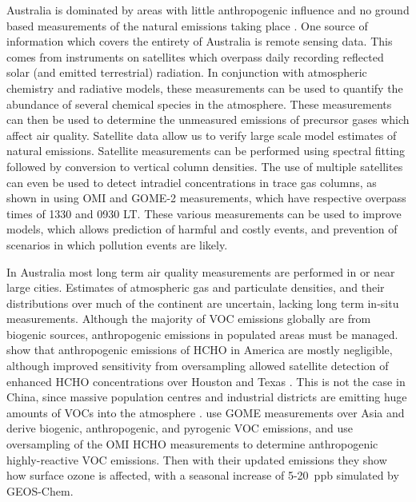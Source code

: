       Australia is dominated by areas with little anthropogenic influence and no ground based measurements of the natural emissions taking place \citep{VanDerA2008}.
      One source of information which covers the entirety of Australia is remote sensing data.
      This comes from instruments on satellites which overpass daily recording reflected solar (and emitted terrestrial) radiation.
      In conjunction with atmospheric chemistry and radiative models, these measurements can be used to quantify the abundance of several chemical species in the atmosphere.
      These measurements can then be used to determine the unmeasured emissions of precursor gases which affect air quality.
      Satellite data allow us to verify large scale model estimates of natural emissions.
      Satellite measurements can be performed using spectral fitting followed by conversion to vertical column densities.
      The use of multiple satellites can even be used to detect intradiel concentrations in trace gas columns, as shown in \cite{Stavrakou2015} using OMI and GOME-2 measurements, which have respective overpass times of 1330 and 0930 LT.
      These various measurements can be used to improve models, which allows prediction of harmful and costly events, and prevention of scenarios in which pollution events are likely.
      
      In Australia most long term air quality measurements are performed in or near large cities.
      Estimates of atmospheric gas and particulate densities, and their distributions over much of the continent are uncertain, lacking long term in-situ measurements.
      Although the majority of VOC emissions globally are from biogenic sources, anthropogenic emissions in populated areas must be managed.
      \cite{Millet2008} show that anthropogenic emissions of HCHO in America are mostly negligible, although improved sensitivity from oversampling allowed satellite detection of enhanced HCHO concentrations over Houston and Texas \citep{Zhu2014}.
      This is not the case in China, since massive population centres and industrial districts are emitting huge amounts of VOCs into the atmosphere \citep{Fu2007}.
      \cite{Fu2007} use GOME measurements over Asia and derive biogenic, anthropogenic, and pyrogenic VOC emissions, and \cite{Zhu2014} use oversampling of the OMI HCHO measurements to determine anthropogenic highly-reactive VOC emissions.
      Then with their updated emissions they show how surface ozone is affected, with a seasonal increase of 5-20~ppb simulated by GEOS-Chem.
      
